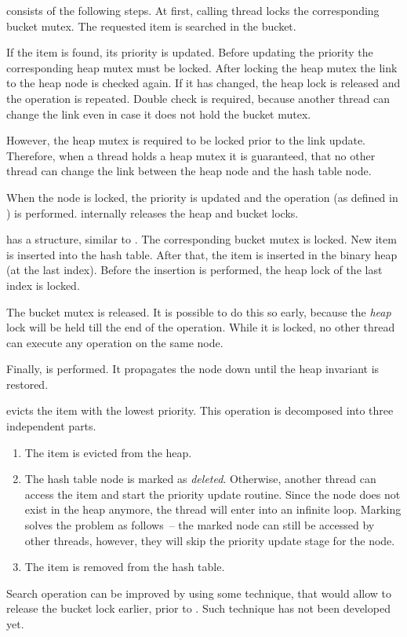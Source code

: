 \begin{block-description}
\item[\findop] consists of the following steps. At first, calling thread locks the corresponding bucket mutex. The requested item is searched in the bucket.

If the item is found, its priority is updated.
Before updating the priority the corresponding heap mutex must be locked.
After locking the heap mutex the link to the heap node is checked again. If it has changed, the heap lock is released and the operation is repeated. Double check is required, because another thread can change the link even in case it does not hold the bucket mutex.

However, the heap mutex is required to be locked prior to the link update. Therefore, when a thread holds a heap mutex it is guaranteed, that no other thread can change the link between the heap node and the hash table node.

When the node is locked, the priority is updated and the  operation (as defined in \cite{champ}) is performed.  internally releases the heap and bucket locks.

\item[\insertop] has a structure, similar to \findop.
The corresponding bucket mutex is locked.
New item is inserted into the hash table. After that, the item is inserted in the binary heap (at the last index). Before the insertion is performed, the heap lock of the last index is locked.

The bucket mutex is released. It is possible to do this so early, because the \emph{heap} lock will be held till the end of the operation. While it is locked, no other thread can execute any operation on the same node.

Finally, \cite{champ} is performed. It propagates the node down until the heap invariant is restored.

 evicts the item with the lowest priority. This operation is decomposed into three independent parts.

\begin{enumerate}
\item The item is evicted from the heap.
\item The hash table node is marked as \emph{deleted}. Otherwise, another thread can access the item and start the priority update routine. Since the node does not exist in the heap anymore, the thread will enter into an infinite loop. Marking solves the problem as follows~-- the marked node can still be accessed by other threads, however, they will skip the priority update stage for the node.
\item The item is removed from the hash table.
\end{enumerate}

\end{block-description}
Search operation can be improved by using some technique, that would allow to release the bucket lock earlier, prior to . Such technique has not been developed yet.


